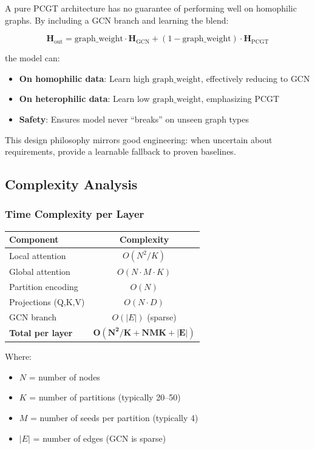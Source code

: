\documentclass[11pt, a4paper]{article}
\begin{document}
A pure PCGT architecture has no guarantee of performing well on homophilic graphs. By including a GCN branch and learning the blend:

\begin{equation}
\mathbf{H}_{\text{out}} = \text{graph\_weight} \cdot \mathbf{H}_{\text{GCN}} + (1 - \text{graph\_weight}) \cdot \mathbf{H}_{\text{PCGT}}
\end{equation}

the model can:
\begin{itemize}
    \item \textbf{On homophilic data}: Learn high $\text{graph\_weight}$, effectively reducing to GCN
    \item \textbf{On heterophilic data}: Learn low $\text{graph\_weight}$, emphasizing PCGT
    \item \textbf{Safety}: Ensures model never ``breaks'' on unseen graph types
\end{itemize}

This design philosophy mirrors good engineering: when uncertain about requirements, provide a learnable fallback to proven baselines.

\subsection{Complexity Analysis}

\subsubsection{Time Complexity per Layer}

\begin{table}[H]
\centering
\begin{tabular}{l c}
\toprule
\textbf{Component} & \textbf{Complexity} \\
\midrule
Local attention & $O(N^2 / K)$ \\
Global attention & $O(N \cdot M \cdot K)$ \\
Partition encoding & $O(N)$ \\
Projections (Q,K,V) & $O(N \cdot D)$ \\
GCN branch & $O(|E|)$ (sparse) \\
\midrule
\textbf{Total per layer} & $\mathbf{O(N^2/K + NMK + |E|)}$ \\
\bottomrule
\end{tabular}
\end{table}

Where:
\begin{itemize}
    \item $N$ = number of nodes
    \item $K$ = number of partitions (typically 20–50)
    \item $M$ = number of seeds per partition (typically 4)
    \item $|E|$ = number of edges (GCN is sparse)
\end{itemize}
\end{document}

